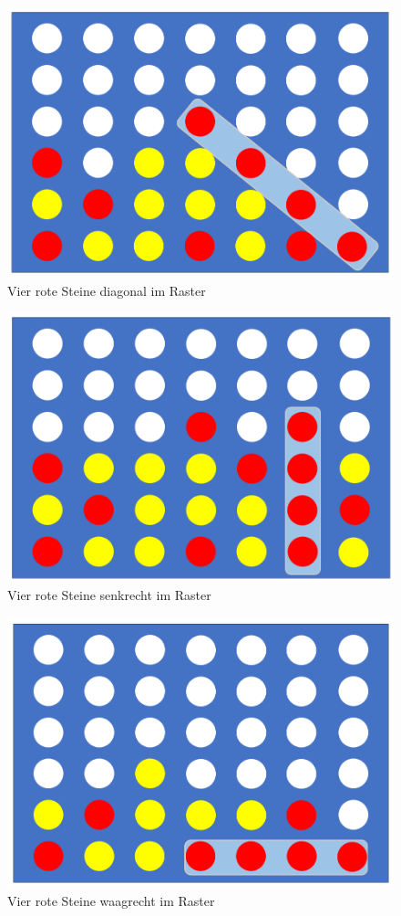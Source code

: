 \begin{figure}[H]
	\centering
	\includegraphics[width=0.8\linewidth]{images/Diagonal}
	\caption[Vier rote Steine diagonal]{Vier rote Steine diagonal im Raster}
	\label{fig:diagonal}
\end{figure}
\begin{figure}[H]
	\centering
	\includegraphics[width=0.8\linewidth]{images/Senkrecht}
	\caption[Vier rote Steine in Reihe senkrecht]{Vier rote Steine senkrecht im Raster}
	\label{fig:senkrecht}
\end{figure}
\begin{figure}[H]
	\centering
	\includegraphics[width=0.8\linewidth]{images/Waagrecht}
	\caption[Vier rote Steine in Reihe waagrecht]{Vier rote Steine waagrecht im Raster}
	\label{fig:waagrecht}
\end{figure}

